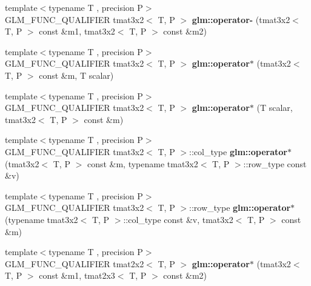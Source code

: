 \begin{DoxyCompactItemize}
\item 
\mbox{\label{type__mat3x2_8inl_a217d480e9710e6861a9b0bfeb767758c}} 
{\footnotesize template$<$typename T , precision P$>$ }\\G\+L\+M\+\_\+\+F\+U\+N\+C\+\_\+\+Q\+U\+A\+L\+I\+F\+I\+ER tmat3x2$<$ T, P $>$ {\bfseries glm\+::operator-\/} (tmat3x2$<$ T, P $>$ const \&m1, tmat3x2$<$ T, P $>$ const \&m2)
\item 
\mbox{\label{type__mat3x2_8inl_ae83d50e0565ebdb64fb89606a5d12057}} 
{\footnotesize template$<$typename T , precision P$>$ }\\G\+L\+M\+\_\+\+F\+U\+N\+C\+\_\+\+Q\+U\+A\+L\+I\+F\+I\+ER tmat3x2$<$ T, P $>$ {\bfseries glm\+::operator$\ast$} (tmat3x2$<$ T, P $>$ const \&m, T scalar)
\item 
\mbox{\label{type__mat3x2_8inl_a3676d69977999d9c445177838f036716}} 
{\footnotesize template$<$typename T , precision P$>$ }\\G\+L\+M\+\_\+\+F\+U\+N\+C\+\_\+\+Q\+U\+A\+L\+I\+F\+I\+ER tmat3x2$<$ T, P $>$ {\bfseries glm\+::operator$\ast$} (T scalar, tmat3x2$<$ T, P $>$ const \&m)
\item 
\mbox{\label{type__mat3x2_8inl_a130119d8e3a84e658a490564c3994e82}} 
{\footnotesize template$<$typename T , precision P$>$ }\\G\+L\+M\+\_\+\+F\+U\+N\+C\+\_\+\+Q\+U\+A\+L\+I\+F\+I\+ER tmat3x2$<$ T, P $>$\+::col\+\_\+type {\bfseries glm\+::operator$\ast$} (tmat3x2$<$ T, P $>$ const \&m, typename tmat3x2$<$ T, P $>$\+::row\+\_\+type const \&v)
\item 
\mbox{\label{type__mat3x2_8inl_afb6b62d8d61e83273b7694a60341ba97}} 
{\footnotesize template$<$typename T , precision P$>$ }\\G\+L\+M\+\_\+\+F\+U\+N\+C\+\_\+\+Q\+U\+A\+L\+I\+F\+I\+ER tmat3x2$<$ T, P $>$\+::row\+\_\+type {\bfseries glm\+::operator$\ast$} (typename tmat3x2$<$ T, P $>$\+::col\+\_\+type const \&v, tmat3x2$<$ T, P $>$ const \&m)
\item 
\mbox{\label{type__mat3x2_8inl_a41c5d9d01bb642d45a1e71fc27328470}} 
{\footnotesize template$<$typename T , precision P$>$ }\\G\+L\+M\+\_\+\+F\+U\+N\+C\+\_\+\+Q\+U\+A\+L\+I\+F\+I\+ER tmat2x2$<$ T, P $>$ {\bfseries glm\+::operator$\ast$} (tmat3x2$<$ T, P $>$ const \&m1, tmat2x3$<$ T, P $>$ const \&m2)

\end{DoxyCompactItemize}
